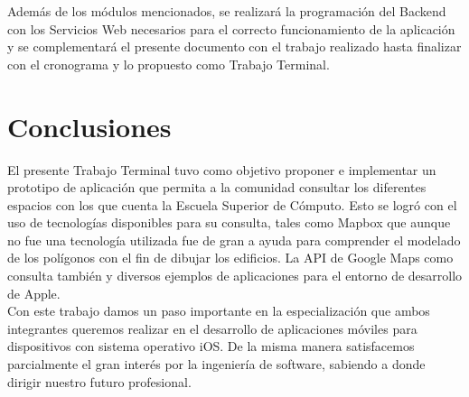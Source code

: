 Además de los módulos mencionados, se realizará la programación del Backend con los Servicios Web necesarios para el correcto funcionamiento de la aplicación y se complementará el presente documento con el trabajo realizado hasta finalizar con el cronograma y lo propuesto como Trabajo Terminal.

\section{Conclusiones}

El presente Trabajo Terminal tuvo como objetivo proponer e implementar un prototipo de aplicación que permita a la comunidad consultar los diferentes espacios con los que cuenta la Escuela Superior de Cómputo. Esto se logró con el uso de tecnologías disponibles para su consulta, tales como Mapbox que aunque no fue una tecnología utilizada fue de gran a ayuda para comprender el modelado de los polígonos con el fin de dibujar los edificios. La API de Google Maps como consulta también y diversos ejemplos de aplicaciones para el entorno de desarrollo de Apple.\\

Con este trabajo damos un paso importante en la especialización que ambos integrantes queremos realizar en el desarrollo de aplicaciones móviles para dispositivos con sistema operativo iOS. De la misma manera satisfacemos parcialmente el gran interés por la ingeniería de software, sabiendo a donde dirigir nuestro futuro profesional.